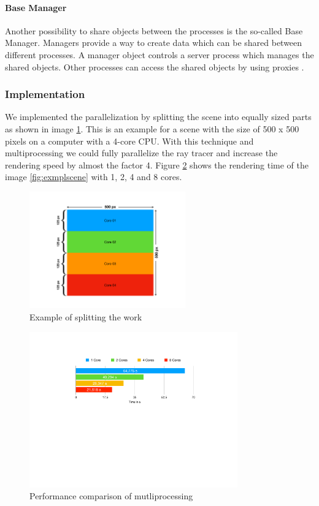 \documentclass[10pt]{scrartcl}
\begin{document}
\paragraph{Base Manager}

Another possibility to share objects between the processes is the so-called Base Manager. Managers provide a way to create data which can be shared between different processes. A manager object controls a server process which manages the shared objects. Other processes can access the shared objects by using proxies \cite{pythondocu}.

\subsubsection{Implementation}

We implemented the parallelization by splitting the scene into equally sized parts as shown in image \ref{fig:processsplit}. This is an example for a scene with the size of 500 x 500 pixels on a computer with a 4-core CPU. With this technique and multiprocessing we could fully parallelize the ray tracer and increase the rendering speed by almost the factor 4. Figure \ref{fig:renderingcmp} shows the rendering time of the image \ref{fig:exmplscene} with 1, 2, 4 and 8 cores. 

\begin{figure}[h]
  \centering
  \includegraphics[width=0.6\textwidth]{images/processsplit.pdf}
  \caption{Example of splitting the work} 
  \label{fig:processsplit} 
\end{figure}

\begin{figure}[h]
  \centering
  \includegraphics[width=0.8\textwidth]{images/renderingcmp.pdf}
  \caption{Performance comparison of mutliprocessing} 
  \label{fig:renderingcmp} 
\end{figure}
\end{document}
